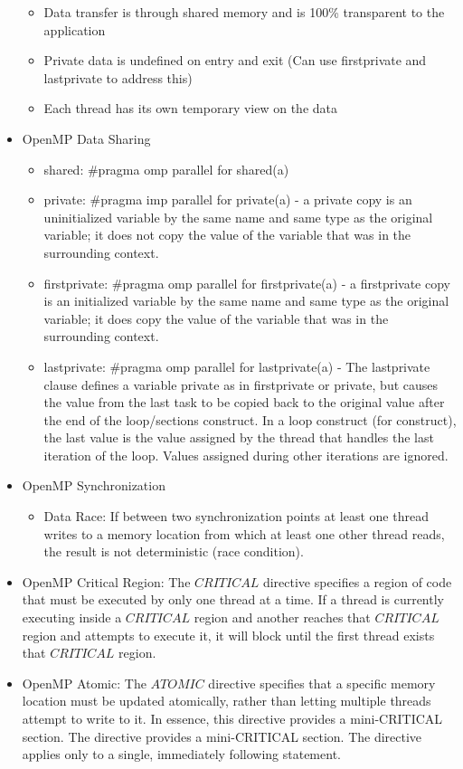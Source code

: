 \documentclass[paper=a4, fontsize=11pt]{scrartcl} %
\numberwithin{equation}{section} %
\numberwithin{figure}{section} %
\numberwithin{table}{section} %
\begin{document}
\begin{itemize}
\begin{itemize}
    \item Data transfer is through shared memory and is 100\% transparent to the application
    \item Private data is undefined on entry and exit (Can use firstprivate and lastprivate to address this)
    \item Each thread has its own temporary view on the data
  \end{itemize}
  \item OpenMP Data Sharing
  \begin{itemize}
    \item shared: #pragma omp parallel for shared(a)
    \item private: #pragma imp parallel for private(a) - a private copy is an uninitialized variable by the same name and same type as the original variable; it does not copy the value of the variable that was in the surrounding context.
    \item firstprivate: #pragma omp parallel for firstprivate(a) - a firstprivate copy is an initialized variable by the same name and same type as the original variable; it does copy the value of the variable that was in the surrounding context.
    \item lastprivate: #pragma omp parallel for lastprivate(a) - The lastprivate clause defines a variable private as in firstprivate or private, but causes the value from the last task to be copied back to the original value after the end of the loop/sections construct. In a loop construct (for construct), the last value is the value assigned by the thread that handles the last iteration of the loop. Values assigned during other iterations are ignored.
  \end{itemize}
  \item OpenMP Synchronization
  \begin{itemize}
    \item Data Race: If between two synchronization points at least one thread writes to a memory location from which at least one other thread reads, the result is not deterministic (race condition).
  \end{itemize}
  \item OpenMP Critical Region: The $CRITICAL$ directive specifies a region of code that must be executed by only one thread at a time. If a thread is currently executing inside a $CRITICAL$ region and another reaches that $CRITICAL$ region and attempts to execute it, it will block until the first thread exists that $CRITICAL$ region.
  \item OpenMP Atomic: The $ATOMIC$ directive specifies that a specific memory location must be updated atomically, rather than letting multiple threads attempt to write to it. In essence, this directive provides a mini-CRITICAL section. The directive provides a mini-CRITICAL section. The directive applies only to a single, immediately following statement.

\end{itemize}
\end{document}

